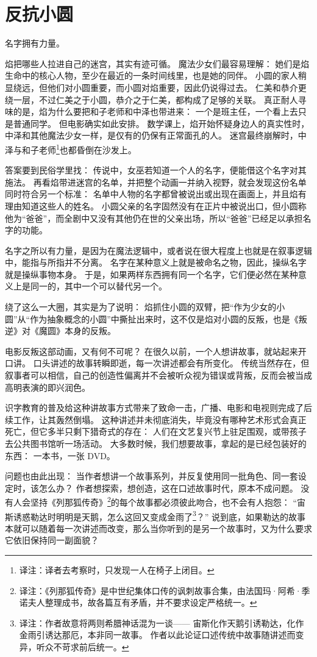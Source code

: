\chapter{反抗小圆}
名字拥有力量。

焰把哪些人拉进自己的迷宫，其实有迹可循。
魔法少女们最容易理解：
她们是焰生命中的核心人物，至少在最近的一条时间线里，也是她的同伴。
小圆的家人稍显绕远，但他们对小圆重要，而小圆对焰重要，因此仍说得过去。
仁美和恭介更绕一层，不过仁美之于小圆，恭介之于仁美，都构成了足够的关联。
真正耐人寻味的是，焰为什么要把和子老师和中泽也带进来：
一个是班主任，一个看上去只是普通同学。
但电影确实如此安排。
数学课上，焰开始怀疑身边人的真实性时，中泽和其他魔法少女一样，是仅有的仍保有正常面孔的人。
迷宫最终崩解时，中泽与和子老师\footnote{%
    译注：译者去考察时，只发现一人在椅子上闭目。
}也都昏倒在沙发上。

答案要到民俗学里找：
传说中，女巫若知道一个人的名字，便能借这个名字对其施法\cite{waite2006black-magic}。
再看焰带进迷宫的名单，并把整个动画一并纳入视野，就会发现这份名单同时符合另一个标准：
名单中人物的名字都曾被说出或出现在画面上，并且焰有理由知道这些人的姓名。
小圆父亲的名字固然没有在正片中被说出口，但小圆称他为“爸爸”，而全剧中又没有其他仍在世的父亲出场，所以“爸爸”已经足以承担名字的功能。

名字之所以有力量，是因为在魔法逻辑中，或者说在很大程度上也就是在叙事逻辑中，能指与所指并不分离。
名字在某种意义上就是被命名之物，因此，操纵名字就是操纵事物本身\cite{waite2006black-magic}。
于是，如果两样东西拥有同一个名字，它们便必然在某种意义上是同一的，其中一个可以替代另一个。

绕了这么一大圈，其实是为了说明：
焰抓住小圆的双臂，把“作为少女的小圆”从“作为抽象概念的小圆”中撕扯出来时，这不仅是焰对小圆的反叛，也是《叛逆》对《魔圆》本身的反叛。

电影反叛这部动画，又有何不可呢？
在很久以前，一个人想讲故事，就站起来开口讲。
口头讲述的故事转瞬即逝，每一次讲述都会有所变化。
传统当然存在，但叙事者可以相信，自己的创造性偏离并不会被听众视为错误或背叛，反而会被当成高明表演的即兴润色。

识字教育的普及给这种讲故事方式带来了致命一击，广播、电影和电视则完成了后续工作，让其轰然倒塌。
这种讲述并未彻底消失，毕竟没有哪种艺术形式会真正死亡，但它多半只剩下猎奇式的存在：
人们在文艺复兴节上驻足围观，或带孩子去公共图书馆听一场活动。
大多数时候，我们想要故事，拿起的是已经包装好的东西：
一本书，一张 DVD。

问题也由此出现：
当作者想讲一个故事系列，并反复使用同一批角色、同一套设定时，该怎么办？
作者想探索，想创造，这在口述故事时代，原本不成问题。
没有人会坚持《列那狐传奇》\footnote{%
    译注：《列那狐传奇》是中世纪集体口传的讽刺故事合集，由法国玛·阿希·季诺夫人整理成书，故各篇互有矛盾，并不要求设定严格统一。
}的每个故事都必须彼此吻合，也不会有人抱怨：
“宙斯诱惑勒达时明明是天鹅，怎么这回又变成金雨了\footnote{%
    译注：作者故意将两则希腊神话混为一谈——
    宙斯化作天鹅引诱勒达，化作金雨引诱达那厄，本非同一故事。
    作者以此论证口述传统中故事随讲述而变异，听众不苛求前后统一。
}？”
说到底，如果勒达的故事本就可以随着每一次讲述而改变，那么当你听到的是另一个故事时，又为什么要求它依旧保持同一副面貌？


